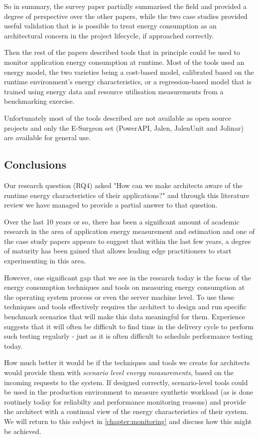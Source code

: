 So in summary, the survey paper partially summarised the field and provided a degree of perspective over the other papers, while the two case studies provided useful validation that is is possible to treat energy consumption as an architectural concern in the project lifecycle, if approached correctly.

Then the rest of the papers described tools that in principle could be used to monitor application energy consumption at runtime.  Most of the tools used an energy model, the two varieties being a cost-based model, calibrated based on the runtime environment's energy characteristics, or a regression-based model that is trained using energy data and resource utilisation measurements from a benchmarking exercise.

Unfortunately most of the tools described are not available as open source projects and only the E-Surgeon set (PowerAPI, Jalen, JalenUnit and Jolinar) are available for general use.


\subsection{Conclusions}

Our research question (RQ4) asked "How can we make architects aware of the runtime energy characteristics of their applications?" and through this literature review we have managed to provide a partial answer to that question.

Over the last 10 years or so, there has been a significant amount of academic research in the area of application energy measurement and estimation and one of the case study papers \cite{jagroep2016-comparingreleases} appears to suggest that within the last few years, a degree of maturity has been gained that allows leading edge practitioners to start experimenting in this area.

However, one significant gap that we see in the research today is the focus of the energy consumption techniques and tools on measuring energy consumption at the operating system process or even the server machine level.  To use these techniques and tools effectively requires the architect to design and run specific benchmark scenarios that will make this data meaningful for them.  Experience suggests that it will often be difficult to find time in the delivery cycle to perform such testing regularly - just as it is often difficult to schedule performance testing today.

How much better it would be if the techniques and tools we create for architects would provide them with \emph{scenario level energy measurements}, based on the incoming requests to the system.  If designed correctly, scenario-level tools could be used in the production environment to measure synthetic workload (as is done routinely today for reliabilty and performance monitoring reasons) and provide the architect with a continual view of the energy characteristics of their system.  We will return to this subject in \cref{chapter:monitoring} and discuss how this might be achieved.
